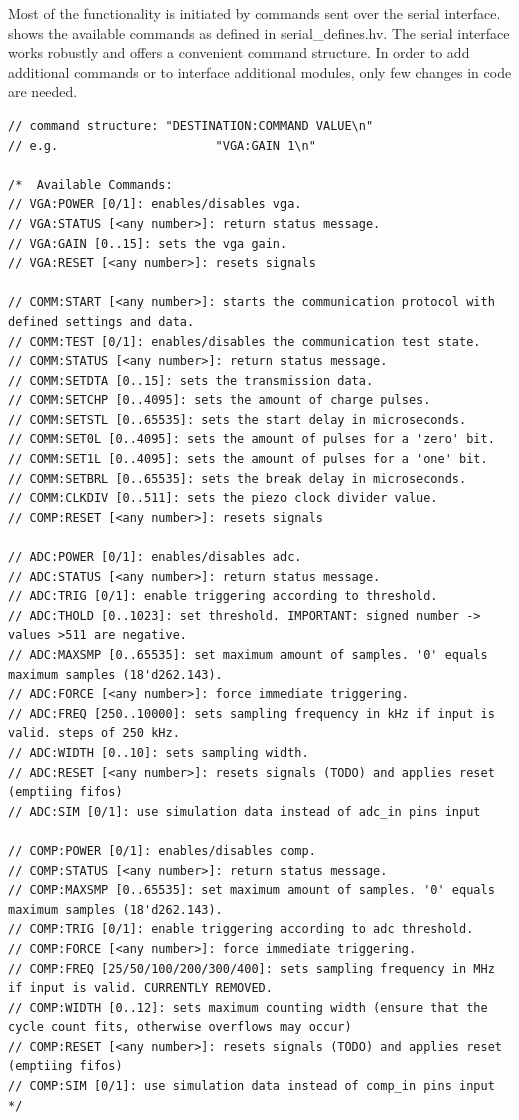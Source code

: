 \documentclass[
	english,
	ruledheaders=section, %
	class=report,%
	thesis={type=Project Seminar Report},%
	accentcolor=TUDa-1d, %
	custommargins=false,%
	marginpar=false,%
	parskip=half-,%
	fontsize=11pt,%
]{tudapub}
\begin{document}
Most of the functionality is initiated by commands sent over the serial interface.  shows the available commands as defined in serial\_defines.hv. The serial interface works robustly and offers a convenient command structure. In order to add additional commands or to interface additional modules, only few changes in code are needed. 
\begin{lstlisting}[caption={Command strings as defined in serials.hv},label=lst:serdef1]
// command structure: "DESTINATION:COMMAND VALUE\n"
// e.g.                      "VGA:GAIN 1\n"

/*  Available Commands:
// VGA:POWER [0/1]: enables/disables vga.
// VGA:STATUS [<any number>]: return status message.
// VGA:GAIN [0..15]: sets the vga gain.
// VGA:RESET [<any number>]: resets signals

// COMM:START [<any number>]: starts the communication protocol with defined settings and data.
// COMM:TEST [0/1]: enables/disables the communication test state.
// COMM:STATUS [<any number>]: return status message.
// COMM:SETDTA [0..15]: sets the transmission data.
// COMM:SETCHP [0..4095]: sets the amount of charge pulses.
// COMM:SETSTL [0..65535]: sets the start delay in microseconds.
// COMM:SET0L [0..4095]: sets the amount of pulses for a 'zero' bit.
// COMM:SET1L [0..4095]: sets the amount of pulses for a 'one' bit.
// COMM:SETBRL [0..65535]: sets the break delay in microseconds.
// COMM:CLKDIV [0..511]: sets the piezo clock divider value.
// COMP:RESET [<any number>]: resets signals

// ADC:POWER [0/1]: enables/disables adc.
// ADC:STATUS [<any number>]: return status message.
// ADC:TRIG [0/1]: enable triggering according to threshold.
// ADC:THOLD [0..1023]: set threshold. IMPORTANT: signed number -> values >511 are negative.
// ADC:MAXSMP [0..65535]: set maximum amount of samples. '0' equals maximum samples (18'd262.143).
// ADC:FORCE [<any number>]: force immediate triggering.
// ADC:FREQ [250..10000]: sets sampling frequency in kHz if input is valid. steps of 250 kHz.
// ADC:WIDTH [0..10]: sets sampling width.  
// ADC:RESET [<any number>]: resets signals (TODO) and applies reset (emptiing fifos)
// ADC:SIM [0/1]: use simulation data instead of adc_in pins input

// COMP:POWER [0/1]: enables/disables comp.
// COMP:STATUS [<any number>]: return status message.
// COMP:MAXSMP [0..65535]: set maximum amount of samples. '0' equals maximum samples (18'd262.143).
// COMP:TRIG [0/1]: enable triggering according to adc threshold.
// COMP:FORCE [<any number>]: force immediate triggering.
// COMP:FREQ [25/50/100/200/300/400]: sets sampling frequency in MHz if input is valid. CURRENTLY REMOVED.
// COMP:WIDTH [0..12]: sets maximum counting width (ensure that the cycle count fits, otherwise overflows may occur)
// COMP:RESET [<any number>]: resets signals (TODO) and applies reset (emptiing fifos)
// COMP:SIM [0/1]: use simulation data instead of comp_in pins input
*/
\end{lstlisting}
\end{document}
